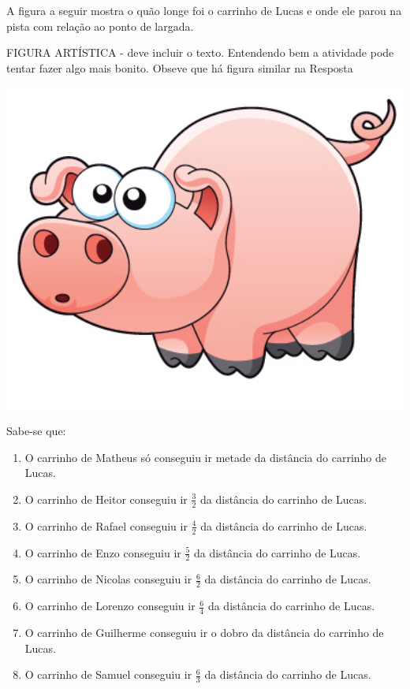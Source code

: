\documentclass[a4,12pt]{book}
\newcounter{atividade}
\begin{document}
A figura a seguir mostra o quão longe foi o carrinho de Lucas e onde ele parou na pista com relação ao ponto de largada.
\begin{imagem*}[breakable]{}{}   FIGURA ARTÍSTICA - deve incluir o texto. Entendendo bem a atividade pode tentar fazer algo mais bonito. Obseve que há figura similar na Resposta\end{imagem*}
\includegraphics[width=600pt, keepaspectratio]{pig}

Sabe-se que:

\begin{enumerate} [\quad a)] %
  \item     O carrinho de Matheus só conseguiu ir metade da distância do carrinho de Lucas.
  \item     O carrinho de Heitor conseguiu ir     $\frac{3}{2}$     da distância do carrinho de Lucas. 
  \item     O carrinho de Rafael conseguiu ir     $\frac{4}{2}$     da distância do carrinho de Lucas.
  \item     O carrinho de Enzo conseguiu ir     $\frac{5}{2}$     da distância do carrinho de Lucas. 
  \item     O carrinho de Nicolas conseguiu ir     $\frac{6}{2}$     da distância do carrinho de Lucas. 
  \item     O carrinho de Lorenzo conseguiu ir     $\frac{6}{4}$     da distância do carrinho de Lucas. 
  \item     O carrinho de Guilherme conseguiu ir o dobro da distância do carrinho de Lucas.
  \item     O carrinho de Samuel conseguiu ir     $\frac{6}{3}$     da distância do carrinho de Lucas. 
\end{enumerate} %
\end{document}

